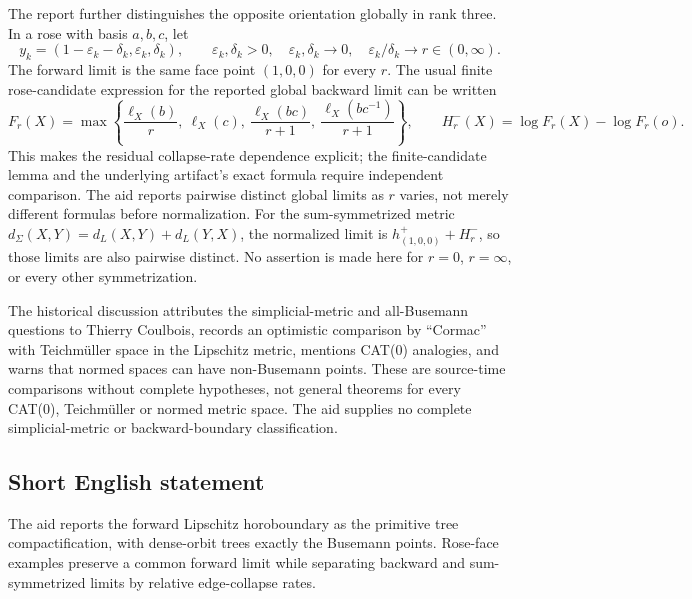 \documentclass[11pt]{article}
\begin{document}
The report further distinguishes the opposite orientation globally in rank three. In a rose with basis \(a,b,c\), let
\[
 y_k=(1-\varepsilon_k-\delta_k,\varepsilon_k,\delta_k),\qquad
 \varepsilon_k,\delta_k>0,\quad\varepsilon_k,\delta_k\to0,\quad
 \varepsilon_k/\delta_k\to r\in(0,\infty).
\]
The forward limit is the same face point \((1,0,0)\) for every \(r\). The usual finite rose-candidate expression for the reported global backward limit can be written
\[
 F_r(X)=\max\left\{\frac{\ell_X(b)}r,\ \ell_X(c),\
 \frac{\ell_X(bc)}{r+1},\ \frac{\ell_X(bc^{-1})}{r+1}\right\},
 \qquad H_r^-(X)=\log F_r(X)-\log F_r(o).
\]
This makes the residual collapse-rate dependence explicit; the finite-candidate lemma and the underlying artifact's exact formula require independent comparison. The aid reports pairwise distinct global limits as \(r\) varies, not merely different formulas before normalization. For the sum-symmetrized metric
\(d_\Sigma(X,Y)=d_L(X,Y)+d_L(Y,X)\),
the normalized limit is \(h_{(1,0,0)}^++H_r^-\), so those limits are also pairwise distinct. No assertion is made here for \(r=0\), \(r=\infty\), or every other symmetrization.

The historical discussion attributes the simplicial-metric and all-Busemann questions to Thierry Coulbois, records an optimistic comparison by ``Cormac'' with Teichmüller space in the Lipschitz metric, mentions CAT(0) analogies, and warns that normed spaces can have non-Busemann points. These are source-time comparisons without complete hypotheses, not general theorems for every CAT(0), Teichmüller or normed metric space. The aid supplies no complete simplicial-metric or backward-boundary classification.
\subsection{Short English statement}
The aid reports the forward Lipschitz horoboundary as the primitive tree compactification, with dense-orbit trees exactly the Busemann points. Rose-face examples preserve a common forward limit while separating backward and sum-symmetrized limits by relative edge-collapse rates.
\end{document}
